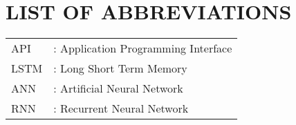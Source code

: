 \newpage
\chapter*{LIST OF ABBREVIATIONS}
\begin{tabular}{l l}
API	&	:	Application Programming Interface	\\
LSTM & : Long Short Term Memory\\
ANN & : Artificial Neural Network\\
RNN & : Recurrent Neural Network\\



\end{tabular}








